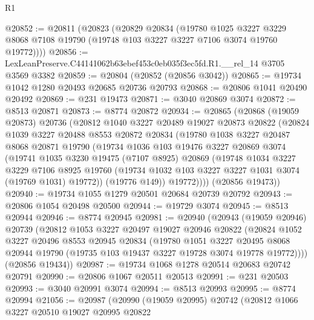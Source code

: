 \begin{lexlean}{R1}
\begin{coremodule}
@20852 := @20811
    (@20823
      (@20829
        @20834
        (@19780
          @1025
          @3227
          @3229
          @8068
          @7108
          @19790
          (@19748 @103 @3227 @3227 @7106 @3074 @19760 @19772))))
@20856 := LexLeanPreserve.C44141062b63ebef453c0eb035f3ec5fd.R1.__rel_14 @3705 @3569 @3382
@20859 := @20804 (@20852 (@20856 @3042))
@20865 := @19734 @1042 @1280 @20493 @20685 @20736 @20793
@20868 := @20806 @1041 @20490 @20492
@20869 := @231 @19473
@20871 := @3040 @20869 @3074
@20872 := @8513 @20871
@20873 := @8774 @20872
@20934 := @20865
    (@20868
      (@19059 @20873)
      @20736
      (@20812
        @1040
        @3227
        @20489
        @19027
        @20873
        @20822
        (@20824
          @1039
          @3227
          @20488
          @8553
          @20872
          @20834
          (@19780
            @1038
            @3227
            @20487
            @8068
            @20871
            @19790
            (@19734
              @1036
              @103
              @19476
              @3227
              @20869
              @3074
              (@19741
                @1035
                @3230
                @19475
                (@7107 @8925)
                @20869
                (@19748
                  @1034
                  @3227
                  @3229
                  @7106
                  @8925
                  @19760
                  (@19734 @1032 @103 @3227 @3227 @1031 @3074 (@19769 @1031) @19772))
                (@19776 @149))
              @19772))))
      (@20856 @19473))
@20940 := @19734 @1055 @1279 @20501 @20684 @20739 @20792
@20943 := @20806 @1054 @20498 @20500
@20944 := @19729 @3074
@20945 := @8513 @20944
@20946 := @8774 @20945
@20981 := @20940
    (@20943
      (@19059 @20946)
      @20739
      (@20812
        @1053
        @3227
        @20497
        @19027
        @20946
        @20822
        (@20824
          @1052
          @3227
          @20496
          @8553
          @20945
          @20834
          (@19780
            @1051
            @3227
            @20495
            @8068
            @20944
            @19790
            (@19735 @103 @19437 @3227 @19728 @3074 @19778 @19772))))
      (@20856 @19434))
@20987 := @19734 @1068 @1278 @20514 @20683 @20742 @20791
@20990 := @20806 @1067 @20511 @20513
@20991 := @231 @20503
@20993 := @3040 @20991 @3074
@20994 := @8513 @20993
@20995 := @8774 @20994
@21056 := @20987
    (@20990
      (@19059 @20995)
      @20742
      (@20812
        @1066
        @3227
        @20510
        @19027
        @20995
        @20822

\end{coremodule}
\end{lexlean}
